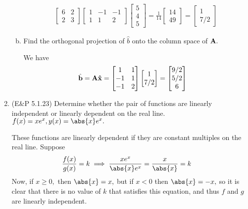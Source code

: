 \documentclass{article}
\begin{document}
\begin{enumerate}
\begin{enumerate}[(a)]
\begin{soln}
\begin{align*}
\begin{bmatrix}
							6 & 2 \\ 2 & 3
						\end{bmatrix}\begin{bmatrix}
							1 & -1 & -1 \\ 1 & 1 & 2
						\end{bmatrix}\begin{bmatrix}
							5 \\ 4 \\ 5
						\end{bmatrix} = \frac{1}{14}\begin{bmatrix}
							14 \\ 49
						\end{bmatrix} = \begin{bmatrix}
							1 \\ 7/2
						\end{bmatrix}
					\end{align*}
				\end{soln}

			\item Find the orthogonal projection of $\hat b$ onto the column space of $\bf A.$
				\begin{soln}
					We have
					\begin{align*}
						\hat{\bf b} &= \bf{A\hat x} = \begin{bmatrix}
							1 & 1 \\ -1 & 1 \\ -1 & 2
						\end{bmatrix}\begin{bmatrix}
							1 \\ 7/2
						\end{bmatrix} = \begin{bmatrix}
							9/2 \\ 5/2 \\ 6
						\end{bmatrix}
					\end{align*}
				\end{soln}

		\end{enumerate}

	\item (E\&P 5.1.23) Determine whether the pair of functions are linearly independent or linearly dependent on the real line. $f(x)=xe^x, y(x)=\abs{x}e^x.$
		\begin{soln}
			These functions are linearly dependent if they are constant multiples on the real line. Suppose
			\begin{align*}
				\frac{f(x)}{g(x)} &= k \implies \frac{xe^x}{\abs{x}e^x} = \frac{x}{\abs{x}}=k
			\end{align*}
			Now, if $x\ge 0,$ then $\abs{x}=x,$ but if $x<0$ then $\abs{x}=-x,$ so it is clear that there is no value of $k$ that satisfies this equation, and thus $f$ and $g$ are linearly independent.
		\end{soln}

\end{enumerate}
\end{document}
